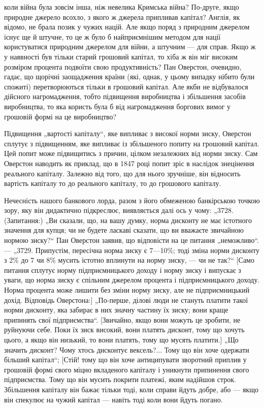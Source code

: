 \parcont{}  %
коли війна була зовсім інша, ніж невелика Кримська війна? По-друге, якщо природне джерело всохло, з
якого ж джерела припливав капітал? Англія, як відомо, не брала позик у чужих націй.
Але якщо поряд з природним джерелом існує ще й штучне, то
це ж було б найприємнішим методом для нації користуватися
природним джерелом для війни, а штучним — для справ. Якщо ж
у наявності був тільки старий грошовий капітал, то хіба ж
він міг високим розміром процента подвоїти свою продуктивність?
Пан Оверстон, очевидно, гадає, що щорічні заощадження країни
(які, однак, у цьому випадку нібито були спожиті) перетворюються тільки в грошовий капітал. Але якби
не відбувалося
дійсного нагромадження, тобто підвищення виробництва і збільшення засобів виробництва, то яка
користь була б від нагромадження боргових вимог у грошовій формі на це виробництво?

Підвищення „вартості капіталу“, яке випливає з високої
норми зиску, Оверстон сплутує з підвищенням, яке випливає
із збільшеного попиту на грошовий капітал. Цей попит може
підвищитись з причин, цілком незалежних від норми зиску. Сам
Оверстон наводить як приклад, що в 1847 році попит зріс в наслідок знецінення реального капіталу.
Залежно від того, що для
нього зручніше, він відносить вартість капіталу то до реального
капіталу, то до грошового капіталу.

Нечесність нашого банкового лорда, разом з його обмеженою
банкірською точкою зору, яку він дидактично підкреслює, виявляється далі ось у чому: „3728.
(Запитання:) „Ви сказали, що,
на вашу думку, норма дисконту не має істотного значення для
купця; чи не будете ласкаві сказати, що ви вважаєте звичайною нормою зиску?“ Пан Оверстон заявив, що
відповісти на це
питання „неможливо“. — „3729. Припустім, пересічна норма
зиску є 7—10\%; тоді зміна норми дисконту з 2\% до 7 чи 8\%
мусить істотно вплинути на норму зиску, — чи не так?“ [Само
питання сплутує норму підприємницького доходу і норму зиску
і випускає з уваги, що норма зиску є спільним джерелом процента
і підприємницького доходу. Норма процента може лишити без
зміни норму зиску, але не підприємницький дохід. Відповідь Оверстона:] „По-перше, ділові люди не
стануть платити такої норми
дисконту, яка забирає в них значну частину їх зиску; вони краще
припинять свої підприємства“. [Звичайно, якщо вони можуть це
зробити, не руйнуючи себе. Поки їх зиск високий, вони платять
дисконт, тому що хочуть цього, а якщо він низький, то вони платять,
тому що мусять платити.] „Що значить дисконт? Чому хтось
дисконтує вексель?... Тому що він хоче одержати більший капітал“; [Стій! тому що він хоче
антиципувати зворотний приплив у грошовій формі свого міцно вкладеного капіталу і
уникнути припинення свого підприємства. Тому що він мусить
покрити платежі, яким надійшов строк. Збільшення капіталу він
бажає тільки тоді, коли справи йдуть добре, або — якщо він спекулює на чужий капітал — навіть тоді
коли вони йдуть погано.
\parbreak{}  %
